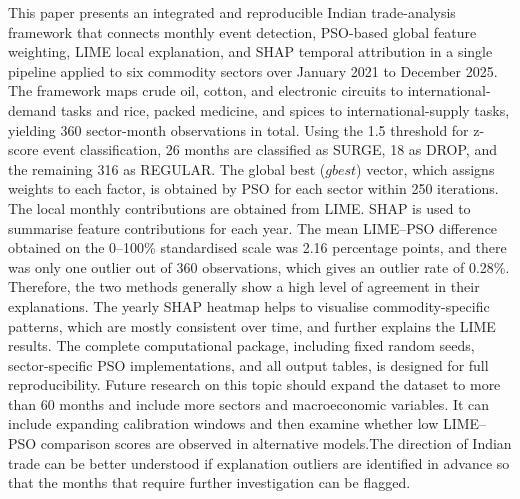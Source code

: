 \documentclass[pdftex,sn-mathphys-num]{sn-jnl}
\begin{document}
This paper presents an integrated and reproducible Indian trade-analysis framework that connects monthly event detection, PSO-based global feature weighting, LIME local explanation, and SHAP temporal attribution in a single pipeline applied to six commodity sectors over January 2021 to December 2025. The framework maps crude oil, cotton, and electronic circuits to international-demand tasks and rice, packed medicine, and spices to international-supply tasks, yielding 360 sector-month observations in total. Using the 1.5 threshold for z-score event classification, 26 months are classified as SURGE, 18 as DROP, and the remaining 316 as REGULAR. The global best ($gbest$) vector, which assigns weights to each factor, is obtained by PSO for each sector within 250 iterations. The local monthly contributions are obtained from LIME. SHAP is used to summarise feature contributions for each year. The mean LIME–PSO difference obtained on the 0–100\% standardised scale was 2.16 percentage points, and there was only one outlier out of 360 observations, which gives an outlier rate of 0.28\%. Therefore, the two methods generally show a high level of agreement in their explanations. The yearly SHAP heatmap helps to visualise commodity-specific patterns, which are mostly consistent over time, and further explains the LIME results. The complete computational package, including fixed random seeds, sector-specific PSO implementations, and all output tables, is designed for full reproducibility. Future research on this topic should expand the dataset to more than 60 months and include more sectors and macroeconomic variables. It can include expanding calibration windows and then examine whether low LIME–PSO comparison scores are observed in alternative models.The direction of Indian trade can be better understood if explanation outliers are identified in advance so that the months that require further investigation can be flagged.
\end{document}
